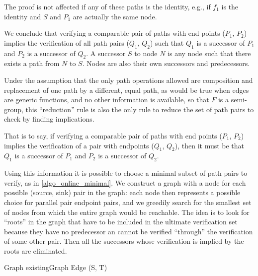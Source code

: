 \documentclass[sigplan,review,anonymous]{acmart}
\begin{document}
{The proof is not affected if any of these  paths is the identity, e.g., if $f_1$ is the identity and $S$ and $P_1$ are actually the same node.

We conclude that verifying a comparable pair of paths with end points ($P_1$, $P_2$) implies the verification of all path pairs ($Q_1$, $Q_2$) such that $Q_1$ is a successor of $P_1$ and $P_2$ is a successor of $Q_2$. A successor $S$ to node $N$ is any node such that there exists a path from $N$ to $S$. Nodes are also their own successors and predecessors.

Under the assumption that the only path operations allowed are composition and replacement of one path by a different, equal path, as would be true when edges are generic functions, and no other information is available, so that $F$ is a semi-group, this ``reduction'' rule is also the only rule to reduce the set of path pairs to check by finding implications.

That is to say, if verifying a comparable pair of paths with end points ($P_1$, $P_2$) implies the verification of a pair with endpoints ($Q_1$, $Q_2$), then it must be that $Q_1$ is a successor of $P_1$ and $P_2$ is a successor of $Q_2$. %

Using this information it is possible to choose a minimal subset of path pairs to verify, as in \ref{algo_online_minimal}.
%
We construct a graph with a node for each possible (source, sink) pair in the graph: each node then represents a possible choice for parallel pair endpoint pairs, and we greedily search for the smallest set of nodes from which the entire graph would be reachable. The idea is to look for ``roots'' in the graph that have to be included in the ultimate verification set because they have no predecessor an cannot be verified ``through'' the verification of some other pair. Then all the successors whose verification is implied by the roots are eliminated.

\begin{algorithm}
\DontPrintSemicolon
{}
Graph existingGraph\;
Edge (S, T)\;
        

\end{algorithm}}
\end{document}
